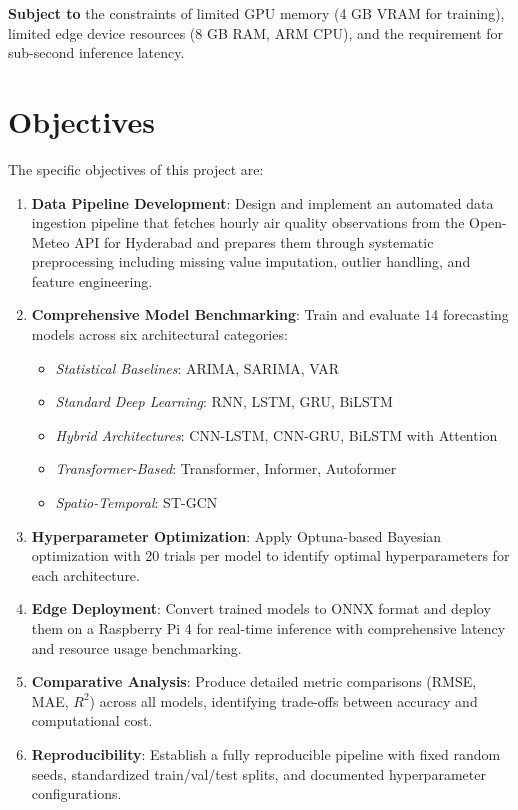 \textbf{Subject to} the constraints of limited GPU memory (4 GB VRAM for training), limited edge device resources (8 GB RAM, ARM CPU), and the requirement for sub-second inference latency.

\section{Objectives}

The specific objectives of this project are:

\begin{enumerate}
    \item \textbf{Data Pipeline Development}: Design and implement an automated data ingestion pipeline that fetches hourly air quality observations from the Open-Meteo API for Hyderabad and prepares them through systematic preprocessing including missing value imputation, outlier handling, and feature engineering.

    \item \textbf{Comprehensive Model Benchmarking}: Train and evaluate 14 forecasting models across six architectural categories:
    \begin{itemize}
        \item \textit{Statistical Baselines}: ARIMA, SARIMA, VAR
        \item \textit{Standard Deep Learning}: RNN, LSTM, GRU, BiLSTM
        \item \textit{Hybrid Architectures}: CNN-LSTM, CNN-GRU, BiLSTM with Attention
        \item \textit{Transformer-Based}: Transformer, Informer, Autoformer
        \item \textit{Spatio-Temporal}: ST-GCN
    \end{itemize}

    \item \textbf{Hyperparameter Optimization}: Apply Optuna-based Bayesian optimization with 20 trials per model to identify optimal hyperparameters for each architecture.

    \item \textbf{Edge Deployment}: Convert trained models to ONNX format and deploy them on a Raspberry Pi 4 for real-time inference with comprehensive latency and resource usage benchmarking.

    \item \textbf{Comparative Analysis}: Produce detailed metric comparisons (RMSE, MAE, $R^2$) across all models, identifying trade-offs between accuracy and computational cost.

    \item \textbf{Reproducibility}: Establish a fully reproducible pipeline with fixed random seeds, standardized train/val/test splits, and documented hyperparameter configurations.
\end{enumerate}

